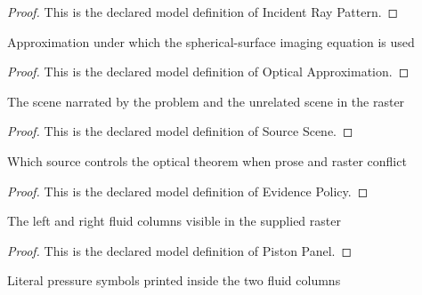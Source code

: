 \begin{proof}
  This is the declared model definition of Incident Ray Pattern.
\end{proof}
\begin{definition}
  \label{def:physics:phyx-mini-0477:phyxminiproblems-problemphyxmini0477-opticalapproximation}
  Approximation under which the spherical-surface imaging equation is used
\end{definition}
\begin{proof}
  This is the declared model definition of Optical Approximation.
\end{proof}
\begin{definition}
  \label{def:physics:phyx-mini-0477:phyxminiproblems-problemphyxmini0477-sourcescene}
  The scene narrated by the problem and the unrelated scene in the raster
\end{definition}
\begin{proof}
  This is the declared model definition of Source Scene.
\end{proof}
\begin{definition}
  \label{def:physics:phyx-mini-0477:phyxminiproblems-problemphyxmini0477-evidencepolicy}
  Which source controls the optical theorem when prose and raster conflict
\end{definition}
\begin{proof}
  This is the declared model definition of Evidence Policy.
\end{proof}
\begin{definition}
  \label{def:physics:phyx-mini-0477:phyxminiproblems-problemphyxmini0477-pistonpanel}
  The left and right fluid columns visible in the supplied raster
\end{definition}
\begin{proof}
  This is the declared model definition of Piston Panel.
\end{proof}
\begin{definition}
  \label{def:physics:phyx-mini-0477:phyxminiproblems-problemphyxmini0477-pressuresymbol}
  Literal pressure symbols printed inside the two fluid columns
\end{definition}
